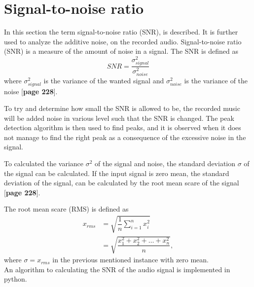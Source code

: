 \section{Signal-to-noise ratio}
In this section the term signal-to-noise ratio (SNR), is described.
It is further used to analyze the additive noise, on the recorded audio.
Signal-to-noise ratio (SNR) is a measure of the amount of noise in a signal. 
The SNR is defined as
\begin{equation}\label{eq:SNR}
	SNR=\frac{\sigma_{signal}^2}{\sigma_{noise}^2}
\end{equation}
where $\sigma_{signal}^2$ is the variance of the wanted signal and $\sigma_{noise}^2$ is the variance of the noise [\textbf{page 228}\cite{DTSP}].

To try and determine how small the SNR is allowed to be, the recorded music will be added noise in various level such that the SNR is changed. 
The peak detection algorithm is then used to find peaks, and it is observed when it does not manage to find the right peak as a consequence of the excessive noise in the signal.

To calculated the variance $\sigma^2$ of the signal and noise, the standard deviation $\sigma$ of the signal can be calculated. 
If the input signal is zero mean, the standard deviation of the signal, can be calculated by the root mean scare of the signal [\textbf{page 228}\cite{DTSP}].

The root mean scare (RMS) is defined as
\begin{align*}
	x_{rms} 
	&=\sqrt{\dfrac{1}{n} \sum_{i=1}^n x_i^2}\\
	&= \sqrt{\dfrac{x_1^2 + x_2^2 + \dots + x_n^2}{n}},
\end{align*}
where $\sigma = x_{rms}$ in the previous mentioned instance with zero mean.\\
An algorithm to calculating the SNR of the audio signal is implemented in python.


